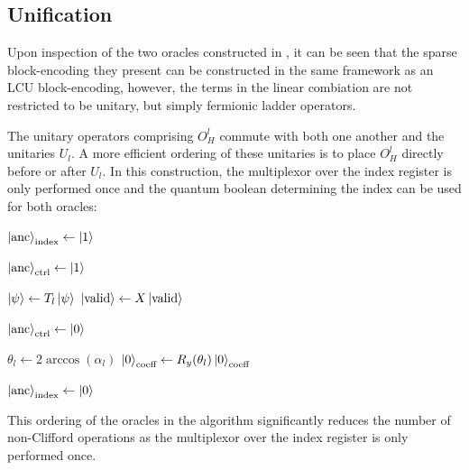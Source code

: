 \subsection{Unification}
\label{subsec:unification}

Upon inspection of the two oracles constructed in \cite{liu2024efficient}, it can be seen that the sparse block-encoding they present can be constructed in the same framework as an LCU block-encoding, however, the terms in the linear combiation are not restricted to be unitary, but simply fermionic ladder operators.

The unitary operators comprising $O_H^l$ commute with both one another and the unitaries $U_l$. 
A more efficient ordering of these unitaries is to place $O_H^l$ directly before or after $U_l$.
In this construction, the multiplexor over the index register is only performed once and the quantum boolean determining the index can be used for both oracles:
\begin{algorithmic}[1]
            \State $\ket{\text{anc}}_{\text{index}} \gets \ket{1}$
        \EndIf

            \State $\ket{\text{anc}}_{\text{ctrl}} \gets \ket{1}$
        \EndIf

            \State $\ket{\psi} \gets T_l \ket{\psi}$
            \State $\ket{\text{valid}} \gets X \ket{\text{valid}}$
        \EndIf

        \State $\ket{\text{anc}}_{\text{ctrl}} \gets \ket{0}$

            \State $\theta_l \gets 2\arccos(\alpha_l)$
            \State $\ket{0}_{\text{coeff}} \gets R_y(\theta_l) \ket{0}_{\text{coeff}}$ 
        \EndIf

        \State $\ket{\text{anc}}_{\text{index}} \gets \ket{0}$
    \EndFor
\end{algorithmic}
This ordering of the oracles in the algorithm significantly reduces the number of non-Clifford operations as the multiplexor over the index register is only performed once.

